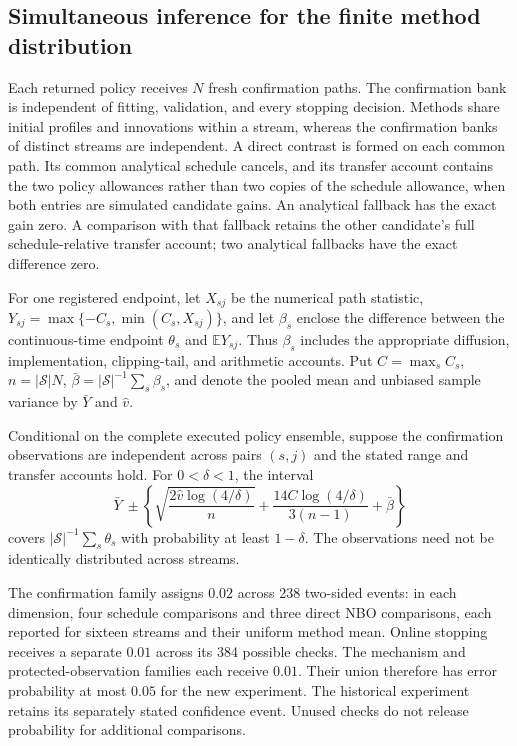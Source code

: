 \subsection{Simultaneous inference for the finite method distribution}
\label{sec:r15methodinference}

Each returned policy receives $N$ fresh confirmation paths. The confirmation
bank is independent of fitting, validation, and every stopping decision.
Methods share initial profiles and innovations within a stream, whereas the
confirmation banks of distinct streams are independent. A direct contrast is
formed on each common path. Its common analytical schedule cancels, and its
transfer account contains the two policy allowances rather than two copies of
the schedule allowance, when both entries are simulated candidate gains.
An analytical fallback has the exact gain zero. A comparison with that
fallback retains the other candidate's full schedule-relative transfer
account; two analytical fallbacks have the exact difference zero.

For one registered endpoint, let $X_{sj}$ be the numerical path statistic,
$Y_{sj}=\max\{-C_s,\min(C_s,X_{sj})\}$, and let $\beta_s$ enclose the
difference between the continuous-time endpoint $\theta_s$ and
$\mathbb E Y_{sj}$. Thus $\beta_s$ includes the appropriate diffusion,
implementation, clipping-tail, and arithmetic accounts. Put
$C=\max_s C_s$, $n=|\mathcal S|N$, $\bar\beta=|\mathcal S|^{-1}\sum_s\beta_s$,
and denote the pooled mean and unbiased sample variance by $\bar Y$ and
$\widehat v$.

\begin{proposition}
\label{prop:r15methodinterval}
Conditional on the complete executed policy ensemble, suppose the
confirmation observations are independent across pairs $(s,j)$ and the stated
range and transfer accounts hold. For $0<\delta<1$, the interval
\begin{equation}
 \bar Y\ \pm\left\{
 \sqrt{\frac{2\widehat v\log(4/\delta)}{n}}
 +\frac{14C\log(4/\delta)}{3(n-1)}+\bar\beta\right\}
 \label{eq:r15methodinterval}
\end{equation}
covers $|\mathcal S|^{-1}\sum_s\theta_s$ with probability at least
$1-\delta$. The observations need not be identically distributed across
streams.
\end{proposition}

The confirmation family assigns $0.02$ across 238 two-sided events: in each
dimension, four schedule comparisons and three direct NBO comparisons, each
reported for sixteen streams and their uniform method mean. Online stopping
receives a separate $0.01$ across its 384 possible checks. The mechanism and
protected-observation families each receive $0.01$. Their union therefore has
error probability at most $0.05$ for the new experiment. The historical
experiment retains its separately stated confidence event. Unused checks do
not release probability for additional comparisons.

